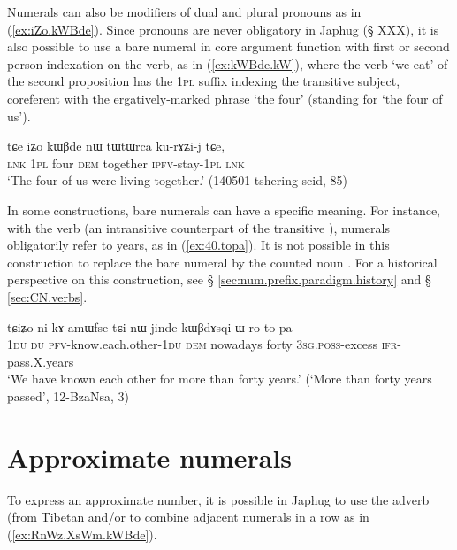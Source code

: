 Numerals can also be modifiers of dual and plural pronouns as in (\ref{ex:iZo.kWBde}). Since pronouns are never obligatory in Japhug (§ XXX), it is also possible to use a bare numeral in core argument function with first or second person indexation on the verb, as in (\ref{ex:kWBde.kW}), where the verb  `we eat' of the second proposition has the \textsc{1pl}  suffix indexing the transitive subject, coreferent with the ergatively-marked phrase  `the four' (standing for  `the four of us').

\begin{exe}
\ex \label{ex:iZo.kWBde} 
\gll tɕe iʑo kɯβde nɯ tɯtɯrca ku-rɤʑi-j tɕe, \\
\textsc{lnk} \textsc{1pl} four \textsc{dem}  together \textsc{ipfv}-stay-\textsc{1pl} \textsc{lnk} \\
\glt `The four of us were living together.' (140501  tshering scid, 85)
\end{exe}		

In some constructions, bare numerals can have a specific meaning. For instance, with the verb  (an intransitive counterpart of the transitive ), numerals obligatorily refer to years, as in (\ref{ex:40.topa}). It is not possible in this construction to replace the bare numeral by the counted noun  . For a historical perspective on this construction, see § \ref{sec:num.prefix.paradigm.history} and § \ref{sec:CN.verbs}.

\begin{exe}
\ex \label{ex:40.topa}  
\gll tɕiʑo ni kɤ-amɯfse-tɕi nɯ jinde kɯβdɤsqi ɯ-ro to-pa \\
\textsc{1du} \textsc{du} \textsc{pfv}-know.each.other-\textsc{1du} \textsc{dem} nowadays forty \textsc{3sg.poss}-excess \textsc{ifr}-pass.X.years \\
\glt  `We have known each other for more than forty years.' (`More than forty years passed', 12-BzaNsa, 3)
\end{exe}		
  
\section{Approximate numerals} \label{sec:approx.numerals}
To express an approximate number, it is possible in Japhug to use the adverb  (from Tibetan  and/or to combine adjacent numerals in a row as in (\ref{ex:RnWz.XsWm.kWBde}).

